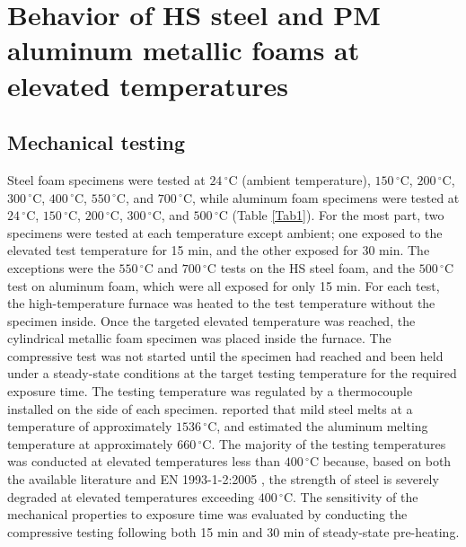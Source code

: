 \documentclass[review]{elsarticle}
\begin{document}
\section{Behavior of HS steel and PM aluminum metallic foams at elevated temperatures}

\subsection*{Mechanical testing}

Steel foam specimens were tested at $24\,^{\circ}\mathrm{C}$ (ambient temperature), $150\,^{\circ}\mathrm{C}$, $200\,^{\circ}\mathrm{C}$, $300\,^{\circ}\mathrm{C}$, $400\,^{\circ}\mathrm{C}$, $550\,^{\circ}\mathrm{C}$, and $700\,^{\circ}\mathrm{C}$, while aluminum foam specimens were tested at $24\,^{\circ}\mathrm{C}$, $150\,^{\circ}\mathrm{C}$, $200\,^{\circ}\mathrm{C}$, $300\,^{\circ}\mathrm{C}$, and $500\,^{\circ}\mathrm{C}$ (Table \ref{Tab1}). For the most part, two specimens were tested at each temperature except ambient; one exposed to the elevated test temperature for 15 min, and the other exposed for 30 min. The exceptions were the $550\,^{\circ}\mathrm{C}$ and $700\,^{\circ}\mathrm{C}$ tests on the HS steel foam, and the $500\,^{\circ}\mathrm{C}$ test on aluminum foam, which were all exposed for only 15 min. For each test, the high-temperature furnace was heated to the test temperature without the specimen inside. Once the targeted elevated temperature was reached, the cylindrical metallic foam specimen was placed inside the furnace. The compressive test was not started until the specimen had reached and been held under a steady-state conditions at the target testing temperature for the required exposure time. The testing temperature was regulated by a thermocouple installed on the side of each specimen. \cite{Avalloneetal2007} reported that mild steel melts at a temperature of approximately $1536\,^{\circ}\mathrm{C}$, and \cite{Ashsby2000} estimated the aluminum melting temperature at approximately $660\,^{\circ}\mathrm{C}$. The majority of the testing temperatures was conducted at elevated temperatures less than $400\,^{\circ}\mathrm{C}$  because, based on both the available literature and EN 1993-1-2:2005 \cite{EC3-1-2}, the strength of steel is severely degraded at elevated temperatures exceeding $400\,^{\circ}\mathrm{C}$. The sensitivity of the mechanical properties to exposure time was evaluated by conducting the compressive testing following both 15 min and 30 min of steady-state pre-heating.
\end{document}
